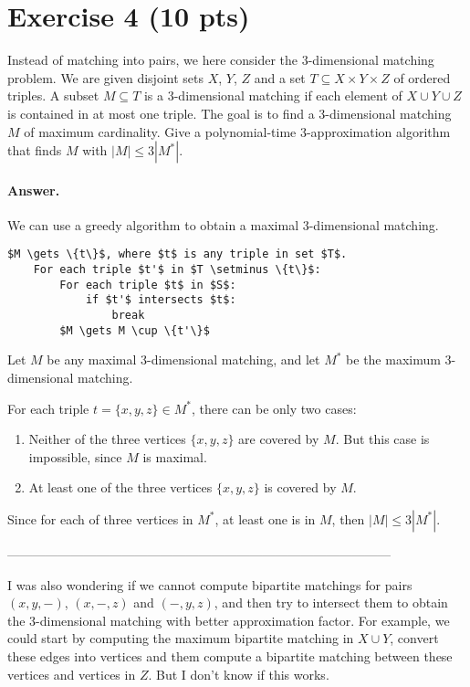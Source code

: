 \documentclass[a4paper]{article}
\begin{document}
\section*{Exercise 4 (10 pts)}

Instead of matching into pairs, we here consider the 3-dimensional matching problem. We are given disjoint sets $X$, $Y$, $Z$ and a set $T \subseteq X \times Y \times Z$ of ordered triples. A subset $M \subseteq T$ is a 3-dimensional matching if each element of $X \cup Y \cup Z$ is contained in at most one triple. The goal is to find a 3-dimensional matching $M$ of maximum cardinality. Give a polynomial-time 3-approximation algorithm that finds $M$ with $|M| \le 3|M^\ast|$.

\paragraph{Answer.}

We can use a greedy algorithm to obtain a maximal 3-dimensional matching.

\begin{lstlisting}[mathescape]
	$M \gets \{t\}$, where $t$ is any triple in set $T$.
	For each triple $t'$ in $T \setminus \{t\}$:
		For each triple $t$ in $S$:
			if $t'$ intersects $t$:
				break
		$M \gets M \cup \{t'\}$
\end{lstlisting}

Let $M$ be any maximal 3-dimensional matching, and let $M^\ast$ be the maximum 3-dimensional matching.

For each triple $t = \{x,y,z\} \in M^\ast$, there can be only two cases:
\begin{enumerate}
	\item Neither of the three vertices $\{x,y,z\}$ are covered by $M$. But this case is impossible, since $M$ is maximal.
	\item At least one of the three vertices $\{x,y,z\}$ is covered by $M$.
\end{enumerate}

Since for each of three vertices in $M^\ast$, at least one is in $M$, then $|M| \le 3|M^\ast|$.

------------------------------------------------------------------------------------------

I was also wondering if we cannot compute bipartite matchings for pairs $(x,y,-)$, $(x,-,z)$ and $(-,y,z)$, and then try to intersect them to obtain the 3-dimensional matching with better approximation factor. For example, we could start by computing the maximum bipartite matching in $X \cup Y$, convert these edges into vertices and them compute a bipartite matching between these vertices and vertices in $Z$. But I don't know if this works.
\end{document}
